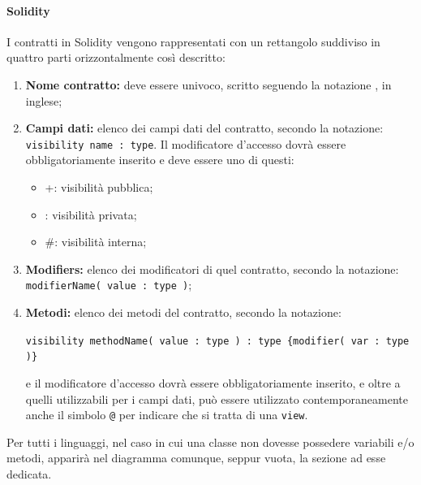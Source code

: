 \documentclass[NormeDiProgetto.tex]{subfiles}
\begin{document}
\paragraph{Solidity}
I contratti in Solidity vengono rappresentati con un rettangolo suddiviso in quattro parti orizzontalmente così descritto:
\begin{enumerate}
	\item \textbf{Nome contratto:} deve essere univoco, scritto seguendo la notazione , in inglese;
	\item \textbf{Campi dati:} elenco dei campi dati del contratto, secondo la notazione: \texttt{visibility name : type}. Il modificatore d'accesso dovrà essere obbligatoriamente inserito e deve essere uno di questi:
	\begin{itemize}
		\item +: visibilità pubblica;
		\item \textendash: visibilità privata;
		\item \#: visibilità interna;
	\end{itemize}
	\item \textbf{Modifiers:} elenco dei modificatori di quel contratto, secondo la notazione:
		\texttt{modifierName( value : type )};
	\item \textbf{Metodi:} elenco dei metodi del contratto, secondo la notazione:
	\begin{center}
		\texttt{visibility methodName( value : type ) : type \{modifier( var : type )\}}
	\end{center}
	e il modificatore d'accesso dovrà essere obbligatoriamente inserito, e oltre a quelli utilizzabili per i campi dati, può essere utilizzato contemporaneamente anche il simbolo \texttt{@} per indicare che si tratta di una \texttt{view}.
\end{enumerate}

Per tutti i linguaggi, nel caso in cui una classe non dovesse possedere variabili e/o metodi, apparirà nel diagramma comunque, seppur vuota, la sezione ad esse dedicata.
\end{document}
